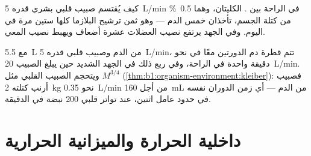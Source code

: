 \begin{omfigure}

{\small كيف يُقتسم صبيب قلبي بشري قدره \qty{5}{L/min} في الراحة بين
. الكليتان، وهما \qty{0.5}{\%} من كتلة الجسم، تأخذان خمس
الدم --- وهو ثمن ترشيح البلازما كلها ستين مرة في اليوم. وفي الجهد
يرتفع نصيب العضلات عشرة أضعاف ويهبط نصيب المعي.}
\end{omfigure}

\begin{example}\label{ex:b1:mammal-organization:circtime}
مع \qty{5.5}{L} من الدم وصبيب قلبي قدره \qty{5}{L/min}، تتم قطرة دم
الدورتين معًا في نحو دقيقة واحدة في الراحة، وفي ربع ذلك في الجهد
الشديد حين يبلغ الصبيب \qty{20}{L/min}. ويتحجم الصبيب القلبي مثل
$M^{3/4}$ (\cref{thm:b1:organism-environment:kleiber}): فصبيب أرنب
كتلته \qty{2}{kg} نحو \qty{0.35}{L/min} من أجل \qty{160}{mL} من
الدم --- أي زمن الدوران نفسه في حدود عامل اثنين، عند تواتر قلبي
\qty{200}{} نبضة في الدقيقة.
\end{example}

\section{داخلية الحرارة والميزانية الحرارية}


